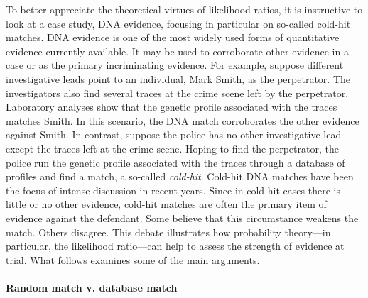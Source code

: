 \documentclass{article}
\begin{document}
To better appreciate the theoretical virtues of
likelihood ratios, 
it is instructive to look 
at a case study, DNA evidence, focusing in particular on so-called cold-hit matches. DNA evidence is one of the most  widely used forms of quantitative evidence currently available.  
It may be used to corroborate other evidence in a case or as the primary  incriminating evidence. For example, suppose different investigative leads point to an individual, Mark Smith, as the perpetrator. The investigators also find several traces at the crime scene left by the perpetrator. Laboratory analyses show that the genetic profile associated with the traces matches Smith. In this scenario, the DNA match corroborates the other evidence against Smith.  In contrast, suppose the police has no other investigative lead except the traces left at the crime scene. Hoping to find the perpetrator, the police run the genetic profile associated with the traces through a database of profiles and  find a match, a so-called  \textit{cold-hit}.
    Cold-hit DNA matches have been the focus of intense discussion in recent years. Since in cold-hit cases there is little or no other evidence, cold-hit matches are often the primary item of evidence against the defendant. Some believe that this circumstance weakens the match. Others disagree.  This debate illustrates how probability theory---in particular, the likelihood ratio---can help to assess the strength of evidence at trial. What follows examines some of the main arguments.



   
   
   \paragraph{Random match v. database match}
   
\end{document}
